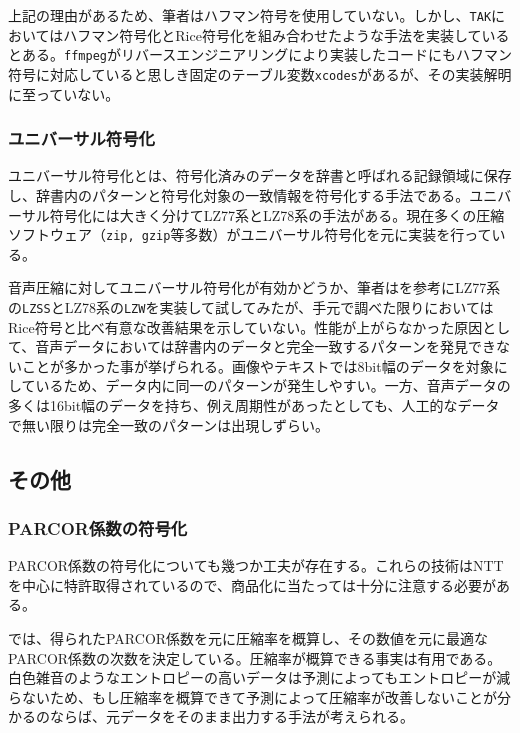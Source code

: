 \documentclass[uplatex,dvipdfmx,b5j,10pt]{jsbook}
\theoremstyle{definition}
\begin{document}
上記の理由があるため、筆者はハフマン符号を使用していない。しかし、\texttt{TAK}においてはハフマン符号化とRice符号化を組み合わせたような手法を実装している\cite{tak}とある。\texttt{ffmpeg}がリバースエンジニアリングにより実装したコード\cite{takdec}にもハフマン符号に対応していると思しき固定のテーブル変数\texttt{xcodes}があるが、その実装解明に至っていない。

\subsubsection{ユニバーサル符号化}

ユニバーサル符号化とは、符号化済みのデータを辞書と呼ばれる記録領域に保存し、辞書内のパターンと符号化対象の一致情報を符号化する手法である。ユニバーサル符号化には大きく分けてLZ77系とLZ78系の手法がある。現在多くの圧縮ソフトウェア（\texttt{zip, gzip}等多数）がユニバーサル符号化を元に実装を行っている。

音声圧縮に対してユニバーサル符号化が有効かどうか、筆者は\cite{datacompresshandbook}を参考にLZ77系の\texttt{LZSS}とLZ78系の\texttt{LZW}を実装して試してみたが、手元で調べた限りにおいてはRice符号と比べ有意な改善結果を示していない。性能が上がらなかった原因として、音声データにおいては辞書内のデータと完全一致するパターンを発見できないことが多かった事が挙げられる。画像やテキストでは8bit幅のデータを対象にしているため、データ内に同一のパターンが発生しやすい。一方、音声データの多くは16bit幅のデータを持ち、例え周期性があったとしても、人工的なデータで無い限りは完全一致のパターンは出現しずらい。

\subsection{その他}

\subsubsection{PARCOR係数の符号化}

PARCOR係数の符号化についても幾つか工夫が存在する。これらの技術はNTTを中心に特許取得されているので、商品化に当たっては十分に注意する必要がある。

\cite{parcorcoefopt}では、得られたPARCOR係数を元に圧縮率を概算し、その数値を元に最適なPARCOR係数の次数を決定している。圧縮率が概算できる事実は有用である。白色雑音のようなエントロピーの高いデータは予測によってもエントロピーが減らないため、もし圧縮率を概算できて予測によって圧縮率が改善しないことが分かるのならば、元データをそのまま出力する手法が考えられる。
\end{document}
